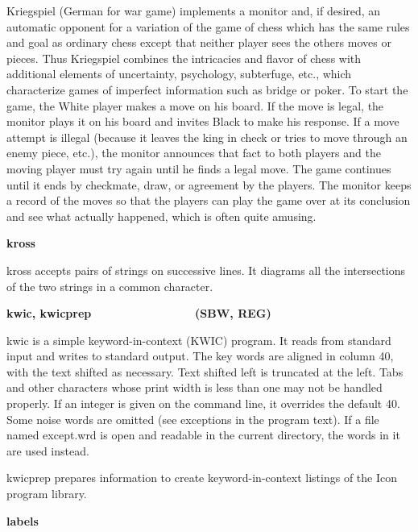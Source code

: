 {Kriegspiel (German for {\textquotedbl}war game{\textquotedbl})
implements a monitor and, if desired, an automatic opponent for a
variation of the game of chess which has the same rules and goal as
ordinary chess except that neither player sees the
other{\textquotesingle}s moves or pieces. Thus Kriegspiel combines the
intricacies and flavor of chess with additional elements of
uncertainty, psychology, subterfuge, etc., which characterize games of
imperfect information such as bridge or poker. To start the game, the
{\textquotedbl}White{\textquotedbl} player makes a move on his board.
If the move is legal, the monitor plays it on his board and invites
{\textquotedbl}Black{\textquotedbl} to make his response. If a move
attempt is illegal (because it leaves the king in check or tries to
move through an enemy piece, etc.), the monitor announces that fact to
both players and the moving player must try again until he finds a
legal move. The game continues until it ends by checkmate, draw, or
agreement by the players. The monitor keeps a record of the moves so
that the players can play the game over at its conclusion and see what
actually happened, which is often quite amusing.

{\sffamily\bfseries
kross\ \ \ \ \ \ \ \ \ \ \ \ \ \ \ \ \ \ \ \ \ \ }

\textsf{kross} accepts pairs of strings on successive lines. It diagrams
all the intersections of the two strings in a common character. 

{\sffamily\bfseries
kwic, kwicprep\ \ \ \ \ \ \ \ \ \ \ \ \ \ \ \ (SBW, REG)}

\textsf{kwic} is a simple keyword-in-context (KWIC) program.
It reads from standard input and writes to standard output. The
{\textquotedbl}key{\textquotedbl} words are aligned in column 40, with
the text shifted as necessary. Text shifted left is truncated at the
left. Tabs and other characters whose {\textquotedbl}print
width{\textquotedbl} is less than one may not be handled properly. If
an integer is given on the command line, it overrides the default 40.
Some noise words are omitted (see
{\textquotedbl}exceptions{\textquotedbl} in the program text). If a
file named \textsf{except.wrd} is open and readable in the current
directory, the words in it are used instead. 

\textsf{kwicprep} prepares information to create keyword-in-context
listings of the Icon program library. 

{\sffamily\bfseries
labels\ \ \ \ \ \ \ \ \ \ \ \ \ \ \ \ \ \ \ \ \ \ }

}
